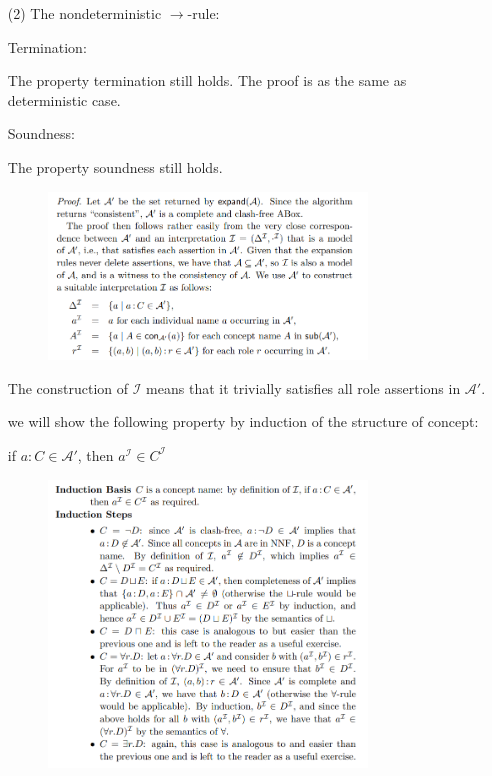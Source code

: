 \documentclass[12pt]{article}
\begin{document}
\begin{enumerate}
\item[(2)] The nondeterministic $\rightarrow $-rule:\par
Termination: \par
The property termination still holds. The proof is as the same as deterministic case.\par
Soundness: \par
The property soundness still holds. \par
\begin{figure}[htbp]
    \centering
    \includegraphics[width=0.8\textwidth,height=0.5\textwidth]{hw92.png}
\end{figure}  \par
The construction of $\mathcal{I}$ means that it trivially satisfies all role assertions in $\mathcal{A}'$.\par
we will show the following property by induction of the structure of concept: \par
if $a: C \in \mathcal{A}'$, then $a^{\mathcal{I}} \in C^{\mathcal{I}}$ \par \newpage
\begin{figure}[htbp]
    \centering
    \includegraphics[width=0.8\textwidth,height=0.5\textwidth]{hw91.png}
\end{figure}  \par

\end{enumerate}
\end{document}
